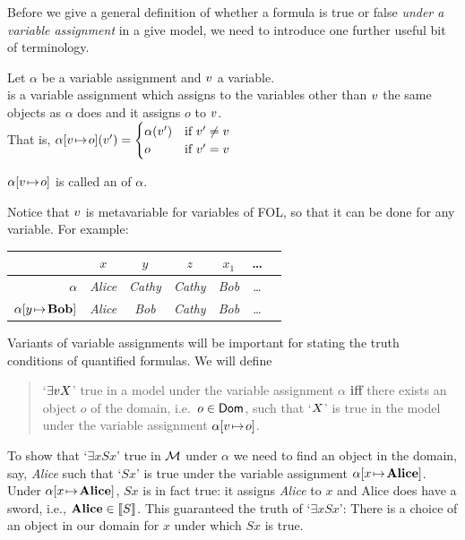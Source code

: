 Before we give a general definition of whether a formula is true or false \emph{under a variable assignment} in a give model, we need to introduce one further useful bit of terminology.

\begin{definition}Let $\alpha$ be a variable assignment and $v$ a variable. \\
	 is a variable assignment which assigns to the variables other than $v$ the same objects as $\alpha$ does and it assigns $o$ to $v$. \\
	That is, $\alpha[v \!\mapsto\! o](v')=
	\begin{cases}
		\alpha(v')&\text{if $v'\neq v$}\\
		o&\text{if $v'=v$}
	\end{cases}$
	
	
	$\alpha[v \!\mapsto\! o]$ is called an  of $\alpha$.\\
\end{definition}

Notice that $v$ is metavariable for variables of FOL, so that it can be done for any variable. 
For example:
\begin{center}
	\begin{tabular}{r@{\,:\quad}cccccc}
		\omit & $x$ & $y$ & $z$ & $x_1$ & \ldots \\ \hline
		$\alpha$ & \emph{Alice} & \emph{Cathy} & \emph{Cathy} & \emph{Bob} & \ldots \\
		$\alpha[y \!\mapsto\! \textbf{Bob}]$ & \emph{Alice} & \emph{Bob} & \emph{Cathy} & \emph{Bob} & \ldots
	\end{tabular}
\end{center}

Variants of variable assignments will be important for stating the truth conditions of quantified formulas.
We will define
\begin{quote}
	`$\exists vX$' true in a model under the variable assignment $\alpha$ \textbf{iff} there exists an object $o$ of the domain, i.e.~$o\in \mathsf{Dom}$, such that `$X$' is true in the model under the variable assignment $\alpha[v \!\mapsto\! o]$.
\end{quote}

To show that `$\exists x Sx$' true in ${\mathcal{M}}$ under $\alpha$ we need to find an object in the domain, say, \emph{Alice} such that `$Sx$' is true under the variable assignment $\alpha[x \!\mapsto\! \text{\textbf{Alice}}]$. Under $\alpha[x \!\mapsto\! \text{\textbf{Alice}}]$, $Sx$ is in fact true: it assigns \emph{Alice} to $x$ and Alice does have a sword, i.e., $\text{\textbf{Alice}}\in\llbracket S\rrbracket$. This guaranteed the truth of `$\exists x Sx$': There is a choice of an object in our domain for $x$ under which $Sx$ is true.

